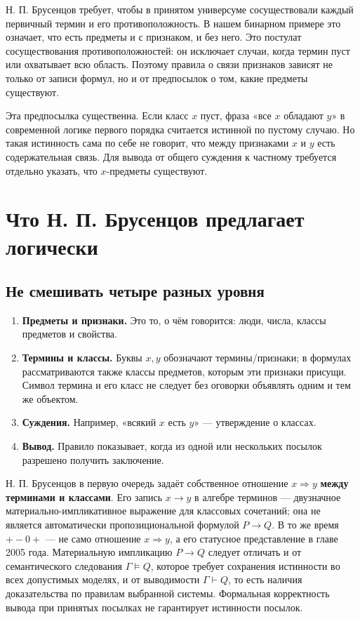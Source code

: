 \documentclass[12pt,a4paper]{article}
\begin{document}
Н. П. Брусенцов требует, чтобы в принятом универсуме сосуществовали каждый первичный термин и его противоположность. В нашем бинарном примере это означает, что есть предметы и с признаком, и без него. Это постулат сосуществования противоположностей: он исключает случаи, когда термин пуст или охватывает всю область. Поэтому правила о связи признаков зависят не только от записи формул, но и от предпосылок о том, какие предметы существуют.

Эта предпосылка существенна. Если класс \(x\) пуст, фраза «все \(x\) обладают \(y\)» в современной логике первого порядка считается истинной по пустому случаю. Но такая истинность сама по себе не говорит, что между признаками \(x\) и \(y\) есть содержательная связь. Для вывода от общего суждения к частному требуется отдельно указать, что \(x\)-предметы существуют.

\section{Что Н. П. Брусенцов предлагает логически}

\subsection{Не смешивать четыре разных уровня}

\begin{enumerate}
\item \textbf{Предметы и признаки.} Это то, о чём говорится: люди, числа, классы предметов и свойства.
\item \textbf{Термины и классы.} Буквы \(x,y\) обозначают термины/признаки; в формулах рассматриваются также классы предметов, которым эти признаки присущи. Символ термина и его класс не следует без оговорки объявлять одним и тем же объектом.
\item \textbf{Суждения.} Например, «всякий \(x\) есть \(y\)» — утверждение о классах.
\item \textbf{Вывод.} Правило показывает, когда из одной или нескольких посылок разрешено получить заключение.
\end{enumerate}
Н. П. Брусенцов в первую очередь задаёт собственное отношение \(x\Rightarrow y\) \textbf{между терминами и классами}. Его запись \(x\to y\) в алгебре терминов — двузначное материально-импликативное выражение для классовых сочетаний; она не является автоматически пропозициональной формулой \(P\to Q\). В то же время \(+-0+\) — не само отношение \(x\Rightarrow y\), а его статусное представление в главе 2005 года. Материальную импликацию \(P\to Q\) следует отличать и от семантического следования \(\Gamma\models Q\), которое требует сохранения истинности во всех допустимых моделях, и от выводимости \(\Gamma\vdash Q\), то есть наличия доказательства по правилам выбранной системы. Формальная корректность вывода при принятых посылках не гарантирует истинности посылок.
\end{document}
